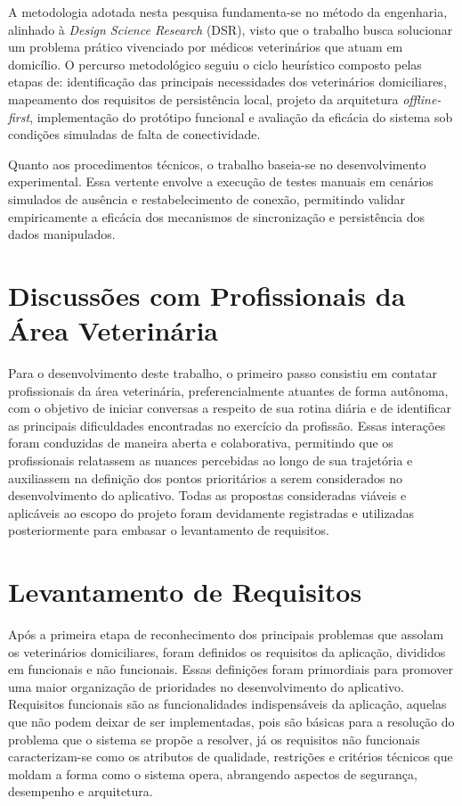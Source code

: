 A metodologia adotada nesta pesquisa fundamenta-se no método da engenharia, alinhado à \textit{Design Science Research} (DSR), visto que o trabalho busca solucionar um problema prático vivenciado por médicos veterinários que atuam em domicílio. O percurso metodológico seguiu o ciclo heurístico composto pelas etapas de: identificação das principais necessidades dos veterinários domiciliares, mapeamento dos requisitos de persistência local, projeto da arquitetura \textit{offline-first}, implementação do protótipo funcional e avaliação da eficácia do sistema sob condições simuladas de falta de conectividade.
    

Quanto aos procedimentos técnicos, o trabalho baseia-se no desenvolvimento experimental. Essa vertente envolve a execução de testes manuais em cenários simulados de ausência e restabelecimento de conexão, permitindo validar empiricamente a eficácia dos mecanismos de sincronização e persistência dos dados manipulados.

\section{Discussões com Profissionais da Área Veterinária}
Para o desenvolvimento deste trabalho, o primeiro passo consistiu em contatar profissionais da área veterinária, preferencialmente atuantes de forma autônoma, com o objetivo de iniciar conversas a respeito de sua rotina diária e de identificar as principais dificuldades encontradas no exercício da profissão. Essas interações foram conduzidas de maneira aberta e colaborativa, permitindo que os profissionais relatassem as nuances percebidas ao longo de sua trajetória e auxiliassem na definição dos pontos prioritários a serem considerados no desenvolvimento do aplicativo. Todas as propostas consideradas viáveis e aplicáveis ao escopo do projeto foram devidamente registradas e utilizadas posteriormente para embasar o levantamento de requisitos.

\section{Levantamento de Requisitos}
Após a primeira etapa de reconhecimento dos principais problemas que assolam os veterinários domiciliares, foram definidos os requisitos da aplicação, divididos em funcionais e não funcionais. Essas definições foram primordiais para promover uma maior organização de prioridades no desenvolvimento do aplicativo. Requisitos funcionais são as funcionalidades indispensáveis da aplicação, aquelas que não podem deixar de ser implementadas, pois são básicas para a resolução do problema que o sistema se propõe a resolver, já os requisitos não funcionais caracterizam-se como os atributos de qualidade, restrições e critérios técnicos que moldam a forma como o sistema opera, abrangendo aspectos de segurança, desempenho e arquitetura.

